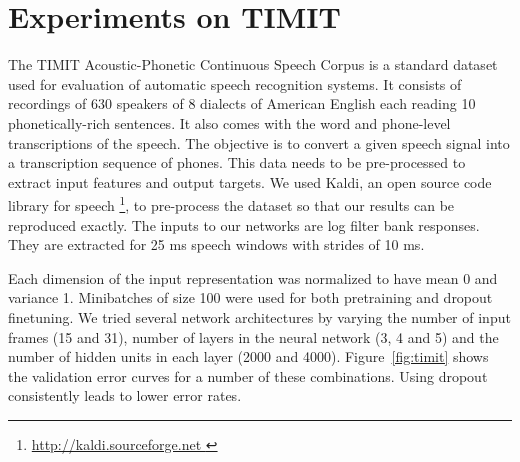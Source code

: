 \documentclass[12pt]{article}
\begin{document}

\section{Experiments on TIMIT}
\label{timitsom}
The TIMIT Acoustic-Phonetic Continuous Speech Corpus is a standard dataset used
for evaluation of automatic speech recognition systems. It consists of
recordings of 630 speakers of 8 dialects of American English each
reading 10 phonetically-rich sentences. It also comes with the word and
phone-level transcriptions of the speech. The objective is to convert a given 
speech signal into a transcription sequence of phones.
This data needs to be pre-processed to extract input features and output targets.
We used Kaldi, an open source code library for speech
\footnote{\url{ http://kaldi.sourceforge.net }}, to
pre-process the dataset so that our results can be reproduced exactly.
The inputs to our networks are log filter bank responses. They are extracted
for 25 ms speech windows with strides of 10 ms. 

Each dimension of the input representation was normalized to have mean 0 and variance 1.
Minibatches of size 100 were used for both pretraining and dropout finetuning. We
tried several network architectures by varying the number of input frames (15 and 31), number of
layers in the neural network (3, 4 and 5) and the number of hidden units in each
layer (2000 and 4000). 
Figure~\ref{fig:timit} shows the validation
error curves for a number of these combinations. Using dropout
consistently leads to lower error rates. %
\end{document}
